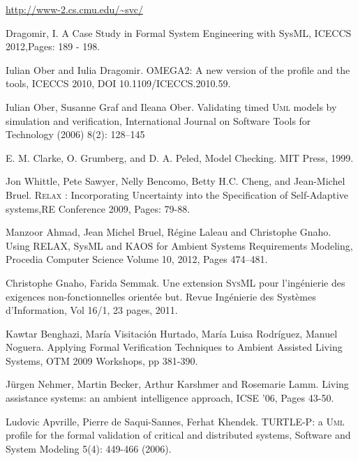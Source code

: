 \documentclass[a4paper,twoside]{article}
\def\myrelax{\textsc{Relax}}                  %
\def\sysml{\textsc{SysML}}
\def\UML{\textsc{Uml}}
\def\uml{\textsc{Uml}}
\newcommand{\final}[1]{#1}
\begin{document}
%

\begin{thebibliography}{1}

\url{http://www-2.cs.cmu.edu/~svc/}

\final{Dragomir, I. A Case Study in Formal System Engineering with SysML, ICECCS 2012,Pages: 189 - 198.}

 \final{Iulian Ober and Iulia Dragomir. OMEGA2: A new version of the profile and the tools, ICECCS 2010,
DOI 10.1109/ICECCS.2010.59.}

  \final{Iulian Ober, Susanne Graf and Ileana Ober. Validating timed \uml{} models by simulation and verification, International Journal on Software Tools for Technology (2006) 8(2): 128–145}

E. M. Clarke, O. Grumberg, and D. A. Peled, Model Checking. MIT Press, 1999.

 \final{Jon Whittle, Pete Sawyer, Nelly Bencomo, Betty H.C. Cheng, and Jean-Michel Bruel. \myrelax{} : Incorporating Uncertainty into the Speciﬁcation of Self-Adaptive systems,RE Conference 2009, Pages: 79-88.}

 \final{Manzoor Ahmad, Jean Michel Bruel, R\'egine Laleau and Christophe Gnaho. Using RELAX, SysML and KAOS for Ambient Systems Requirements Modeling, Procedia Computer Science Volume 10, 2012, Pages 474–481.}

 Christophe Gnaho, Farida Semmak. Une extension \sysml{} pour l'ing\'enierie des exigences non-fonctionnelles orient\'ee but. Revue Ing\'enierie des Syst\`emes d'Information, Vol 16/1, 23 pages, 2011.

 Kawtar Benghazi, Mar\'ia Visitaci\'on Hurtado, Mar\'ia Luisa Rodr\'iguez, Manuel Noguera. Applying Formal Verification Techniques to Ambient Assisted Living Systems, OTM 2009 Workshops, pp 381-390.

 J\"urgen Nehmer, Martin Becker, Arthur Karshmer and Rosemarie Lamm. Living assistance systems: an ambient intelligence approach, ICSE '06, Pages 43-50. 


 Ludovic Apvrille, Pierre de Saqui-Sannes, Ferhat Khendek. TURTLE-P: a \UML{} profile for the formal validation of critical and distributed systems, Software and System Modeling 5(4): 449-466 (2006).


\end{thebibliography}
\end{document}
